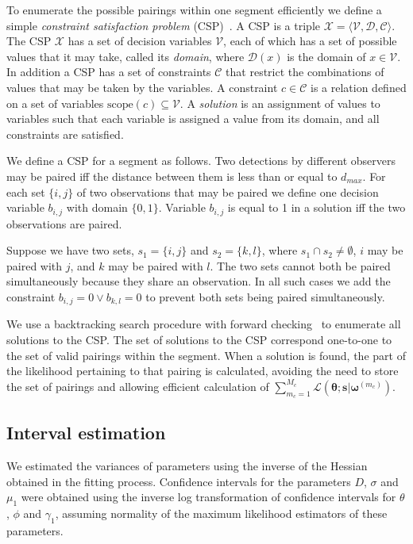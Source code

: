 \documentclass[useAMS, usenatbib, referee]{biom}\usepackage[]{graphicx}\usepackage[]{color}
\begin{document}
To enumerate the possible pairings within one segment efficiently we define a simple \textit{constraint satisfaction problem} (CSP)~\cite[Chapter 6]{russell-norvig-aima3}. A CSP is a triple \(\mathcal{X}=\langle \mathcal{V}, \mathcal{D}, \mathcal{C} \rangle\).  The CSP \(\mathcal{X}\) has a set of decision variables \(\mathcal{V}\), each of which has a set of possible values that it may take, called its \textit{domain}, where \(\mathcal{D}(x)\) is the domain of \(x \in \mathcal{V}\). In addition a CSP has a set of constraints \(\mathcal{C}\) that restrict the combinations of values that may be taken by the variables. A constraint \(c\in \mathcal{C}\) is a relation defined on a set of variables \(\mathrm{scope}(c)\subseteq \mathcal{V}\). A \textit{solution} is an assignment of values to variables such that each variable is assigned a value from its domain, and all constraints are satisfied. 

We define a CSP for a segment as follows. 
Two detections by different observers may be paired iff the distance between them is less than or equal to \(d_{max}\). For each set \(\{i,j\}\) of two observations that may be paired we define one decision variable \(b_{i,j}\) with domain \(\{0,1\}\). Variable \(b_{i,j}\) is equal to 1 in a solution iff the two observations are paired. 

Suppose we have two sets, \(s_1=\{i,j\}\) and \(s_2=\{k,l\}\), where \(s_1 \cap s_2 \ne \emptyset\), \(i\) may be paired with \(j\), and \(k\) may be paired with \(l\). The two sets cannot both be paired simultaneously because they share an observation. In all such cases we add the constraint \(b_{i,j}=0 \vee b_{k,l}=0\) to prevent both sets being paired simultaneously. 

We use a backtracking search procedure with forward checking~\cite[Chapter 6]{russell-norvig-aima3} to enumerate all solutions to the CSP. The set of solutions to the CSP correspond one-to-one to the set of valid pairings within the segment. When a solution is found, the part of the likelihood pertaining to that pairing is calculated, avoiding the need to store the set of pairings and allowing efficient calculation of \(\sum_{m_c=1}^{M_c}\mathcal{L}(\bm{\theta};\bm{s}|\bm{\omega}^{(m_c)})\).


\subsection{Interval estimation}
\label{sec:ci}

We estimated the variances of parameters using the inverse of the Hessian obtained in the fitting process. Confidence intervals for the parameters $D$, $\sigma$ and $\mu_1$ were obtained using the inverse log transformation of confidence intervals for $\theta$, $\phi$ and $\gamma_1$, assuming normality of the maximum likelihood estimators of these parameters. 
\end{document}
